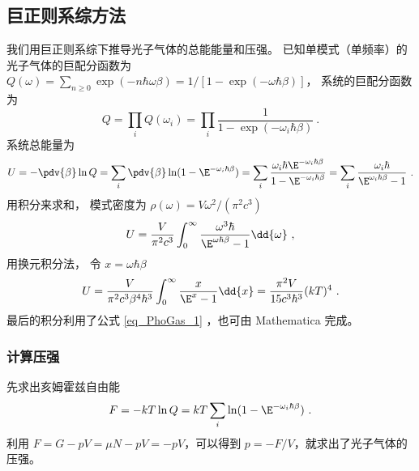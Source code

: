\subsection{巨正则系综方法}
我们用巨正则系综下推导光子气体的总能能量和压强。 已知单模式（单频率）的光子气体的巨配分函数为 $Q(\omega) =\sum_{n\ge 0} \exp(-n\hbar\omega\beta)= 1/[1-\exp(-\omega\hbar\beta)]$， 系统的巨配分函数为
\begin{equation}
Q = \prod_i Q(\omega_i) = \prod_i \frac{1}{1-\exp(-\omega_i\hbar\beta)}~.
\end{equation}
系统总能量为
\begin{equation}
U = -\pdv{\beta} \ln Q = \sum_i \pdv{\beta} \ln(1 - \E^{-\omega_i \hbar \beta}) = \sum_i \frac{\omega_i \hbar \E^{-\omega_i \hbar\beta}}{1-\E^{-\omega_i \hbar \beta}} = \sum_i \frac{\omega_i \hbar}{\E^{\omega_i\hbar\beta} - 1}~.
\end{equation}
用积分来求和， 模式密度为 $\rho(\omega) = V\omega^2/(\pi^2 c^3)$
\begin{equation}
U = \frac{V}{\pi^2 c^3} \int_0^\infty \frac{\omega^3 \hbar}{\E^{\omega\hbar\beta} - 1}\dd{\omega}~,
\end{equation}
用换元积分法， 令 $x = \omega\hbar\beta$
\begin{equation}
U = \frac{V}{\pi^2c^3 \beta^4 \hbar^3} \int_0^\infty \frac{x}{\E^x - 1}\dd{x} = \frac{\pi^2 V}{15c^3 \hbar^3} (kT)^4~.
\end{equation}
最后的积分利用了公式 \autoref{eq_PhoGas_1} ，也可由 Mathematica 完成。

\subsubsection{计算压强}
先求出亥姆霍兹自由能
\begin{equation}
F = -kT \ln Q = kT \sum_i \ln(1 - \E^{-\omega_i \hbar\beta})~.
\end{equation}
利用 $F=G-pV=\mu N-pV=-pV$，可以得到 $p=-F/V$，就求出了光子气体的压强。